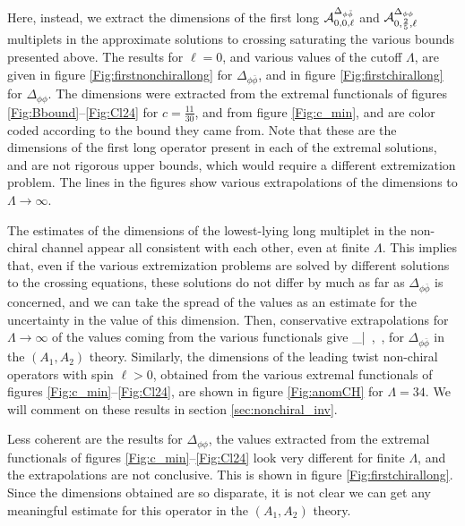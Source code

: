 Here, instead, we extract the dimensions of the first long $\AA_{0,0,\ell}^{\Delta_{\phi\bar{\phi}}}$ and $\AA_{0,\frac25,\ell}^{\Delta_{\phi\phi}}$ multiplets in the approximate solutions to crossing saturating the various bounds presented above. 
The results for $\ell=0$, and various values of the cutoff $\Lambda$, are given in figure \ref{Fig:firstnonchirallong} for  $\Delta_{\phi \bar{\phi}}$, and in figure \ref{Fig:firstchirallong} for $\Delta_{\phi \phi}$.
The dimensions were extracted from the extremal functionals \cite{ElShowk:2012hu} of figures \ref{Fig:Bbound}--\ref{Fig:Cl24} for $c=\tfrac{11}{30}$, and from figure \ref{Fig:c_min}, and are color coded according to the bound they came from. Note that these are the dimensions of the first long operator present in each of the extremal solutions, and are not rigorous upper bounds, which would require a different extremization problem. The lines in the figures show various extrapolations of the dimensions to $\Lambda \to \infty$.


The estimates of the dimensions of the lowest-lying long multiplet in the non-chiral channel appear all consistent with each other, even at finite $\Lambda$. This implies that, even if the various extremization problems are solved by different solutions to the crossing equations, these solutions do not differ by much as far as $\Delta_{\phi \bar{\phi}}$ is concerned, and we can take the spread of the values as an estimate for the uncertainty in the value of this dimension. Then, conservative extrapolations for $\Lambda \to \infty$ of the values coming from the various functionals give
 \lesssim \Delta_{\phi \bar{\phi}}  \,, \qquad {} \Lambda \to \infty\,,
\label{eq:dimextrapol}
\ee
for $\Delta_{\phi \bar{\phi}}$ in the $(A_1,A_2)$ theory.
Similarly, the dimensions of the leading twist non-chiral operators with spin $\ell >0$, obtained from the various extremal functionals of figures \ref{Fig:c_min}--\ref{Fig:Cl24}, are shown in figure \ref{Fig:anomCH} for $\Lambda=34$. We will comment on these results in section \ref{sec:nonchiral_inv}.

Less coherent are the results for $\Delta_{\phi \phi}$, the values  extracted from the extremal functionals of figures \ref{Fig:c_min}--\ref{Fig:Cl24} look very different for finite $\Lambda$, and the extrapolations are not conclusive. This is shown in  figure \ref{Fig:firstchirallong}.
Since the dimensions obtained are so disparate, it is not clear we can get any meaningful estimate for this operator in the $(A_1,A_2)$ theory. 




